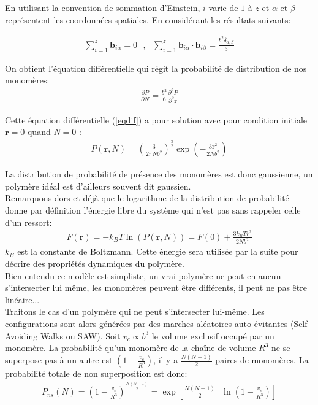 \documentclass[a4paper,11pt]{article}
\begin{document}
En utilisant la convention de sommation d'Einstein, $i$ varie de $1$ à $z$ et $\alpha$ et $\beta$ représentent les coordonnées spatiales. En considérant les résultats suivants:

\begin{eqnarray}
\sum_{i=1}^{z}\textbf{b}_{i\alpha}=0 \text{ },\text{ } \sum_{i=1}^{z}\textbf{b}_{i\alpha}\cdot\textbf{b}_{i\beta} = \frac{b^2\delta_{\alpha,\beta}}{3}
\end{eqnarray}

On obtient l'équation différentielle qui régit la probabilité de distribution de nos monomères:
\begin{eqnarray}
 \frac{\partial P}{\partial N} =   \frac{b^2}{6}\frac{\partial ^2 P}{\partial ^2 \textbf{r}}
 \label{eqdif}
\end{eqnarray}

Cette équation différentielle (\ref{eqdif}) a pour solution avec pour condition initiale $\textbf{r}=0$ quand $N=0$ :
\begin{eqnarray}
P(\textbf{r},N)=\left(\frac{3}{2\pi N b^2}\right)^\frac{3}{2}\exp\left(-\frac{3\textbf{r}^2}{2 N b^2}\right)
\end{eqnarray}

La distribution de probabilité de présence des monomères est donc gaussienne, un polymère idéal est d'ailleurs souvent dit gaussien.\\

Remarquons dors et déjà que le logarithme de la distribution de probabilité donne par définition l'énergie libre du système qui n'est pas sans rappeler celle d'un ressort:
\begin{eqnarray}
F(\textbf{r})= - k_B T \ln(P(\textbf{r},N))= F(0)+\frac{3k_BTr^2}{2Nb^2}
\label{elibre}
\end{eqnarray}
$k_B$ est la constante de Boltzmann. Cette énergie sera utilisée par la suite pour décrire des propriétés dynamiques du polymère.\\



Bien entendu ce modèle est simpliste, un vrai polymère ne peut en aucun s'intersecter lui même, les monomères peuvent être différents, il peut ne pas être linéaire...\\

 Traitons le cas d'un polymère qui ne peut s'intersecter lui-même. Les configurations sont alors générées par des marches aléatoires auto-évitantes (Self Avoiding Walks ou SAW). Soit $v_c \propto b^3$ le volume exclusif occupé par un monomère. La probabilité qu'un monomère de la chaîne de volume $R^3$ ne se superpose pas à un autre est $(1-\frac{v_c}{R^3})$, il y a $\frac{N(N-1)}{2}$ paires de monomères. La probabilité totale de non superposition est donc:
 \begin{eqnarray}
P_{ns}(N)= \left(1-\frac{v_c}{R^3}\right)^{\frac{N(N-1)}{2}} = \exp\left[\frac{N(N-1)}{2}\text{ }\ln\left(1-\frac{v_c}{R^3}\right)\right]
\end{eqnarray}
\end{document}
